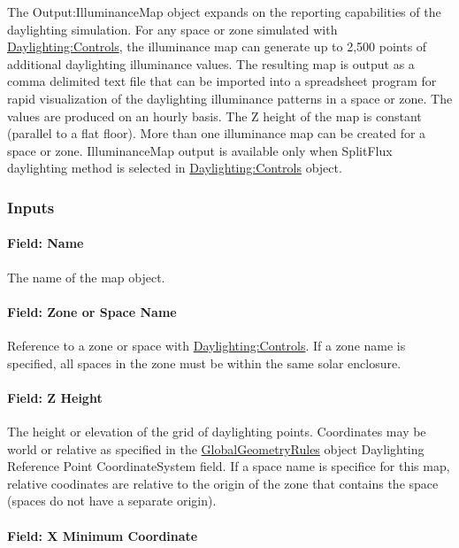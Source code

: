 The Output:IlluminanceMap object expands on the reporting capabilities of the daylighting simulation. For any space or zone simulated with \hyperref[daylightingcontrols-000]{Daylighting:Controls}, the illuminance map can generate up to 2,500 points of additional daylighting illuminance values. The resulting map is output as a comma delimited text file that can be imported into a spreadsheet program for rapid visualization of the daylighting illuminance patterns in a space or zone. The values are produced on an hourly basis. The Z height of the map is constant (parallel to a flat floor). More than one illuminance map can be created for a space or zone. IlluminanceMap output is available only when SplitFlux daylighting method is selected in \hyperref[daylightingcontrols-000]{Daylighting:Controls} object.

\subsubsection{Inputs}\label{inputs-4-006}

\paragraph{Field: Name}\label{field-name-2-007}

The name of the map object.

\paragraph{Field: Zone or Space Name}\label{field-zone-name-2-000}

Reference to a zone or space with \hyperref[daylightingcontrols-000]{Daylighting:Controls}. If a zone name is specified, all spaces in the zone must be within the same solar enclosure.

\paragraph{Field: Z Height}\label{field-z-height}

The height or elevation of the grid of daylighting points.  Coordinates may be world or relative as specified in the \hyperref[globalgeometryrules]{GlobalGeometryRules} object Daylighting Reference Point CoordinateSystem field. If a space name is specifice for this map, relative coodinates are relative to the origin of the zone that contains the space  (spaces do not have a separate origin).

\paragraph{Field: X Minimum Coordinate}\label{field-x-minimum-coordinate}

